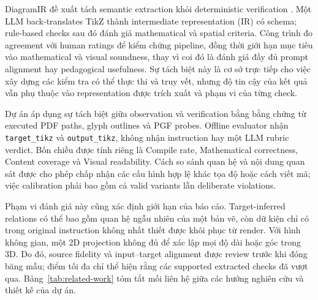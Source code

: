 \documentclass[a4paper,12pt]{article}
\begin{document}
DiagramIR đề xuất tách semantic extraction khỏi deterministic verification \cite{ref2}. Một LLM back-translates TikZ thành intermediate representation (IR) có schema; rule-based checks sau đó đánh giá mathematical và spatial criteria. Công trình đo agreement với human ratings để kiểm chứng pipeline, đồng thời giới hạn mục tiêu vào mathematical và visual soundness, thay vì coi đó là đánh giá đầy đủ prompt alignment hay pedagogical usefulness. Sự tách biệt này là cơ sở trực tiếp cho việc xây dựng các kiểm tra có thể thực thi và truy vết, nhưng độ tin cậy của kết quả vẫn phụ thuộc vào representation được trích xuất và phạm vi của từng check.

Dự án áp dụng sự tách biệt giữa observation và verification bằng bằng chứng từ executed PDF paths, glyph outlines và PGF probes. Offline evaluator nhận \texttt{target\_tikz} và \texttt{output\_tikz}, không nhận instruction hay một LLM rubric verdict. Bốn chiều được tính riêng là Compile rate, Mathematical correctness, Content coverage và Visual readability. Cách so sánh quan hệ và nội dung quan sát được cho phép chấp nhận các cấu hình hợp lệ khác tọa độ hoặc cách viết mã; việc calibration phải bao gồm cả valid variants lẫn deliberate violations.

Phạm vi đánh giá này cũng xác định giới hạn của báo cáo. Target-inferred relations có thể bao gồm quan hệ ngẫu nhiên của một bản vẽ, còn dữ kiện chỉ có trong original instruction không nhất thiết được khôi phục từ render. Với hình không gian, một 2D projection không đủ để xác lập mọi độ dài hoặc góc trong 3D. Do đó, source fidelity và input--target alignment được review trước khi đóng băng mẫu; điểm tối đa chỉ thể hiện rằng các supported extracted checks đã vượt qua. Bảng~\ref{tab:related-work} tóm tắt mối liên hệ giữa các hướng nghiên cứu và thiết kế của dự án.
\end{document}
